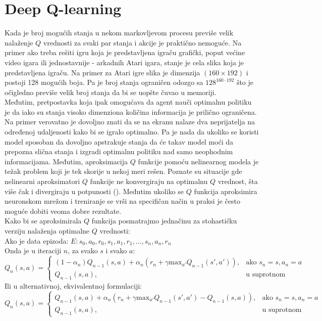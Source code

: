 \documentclass[a4paper,fleqn,12pt]{JMThesis}
\newcommand{\latin}{\fontencoding{T1}\selectfont\selectlanguage{english}}
\theoremstyle{plain}
\theoremstyle{definition}
\theoremstyle{definition}
\begin{document}
\section{Deep Q-learning}
Kada je broj mogućih stanja u nekom markovljevom procesu previše velik nalaženje $Q$ vrednosti za svaki par stanja i akcije je praktično
nemoguće. Na primer ako treba rešiti igru koja je predstavljena igraču grafički, poput većine video igara ili jednostavnije -
arkadnih Atari igara, stanje je cela slika koja je predstavljena igraču. Na primer za Atari igre slika je dimenzija $(160 \times 192)$
i postoji 128 mogućih boja. Pa je broj stanja ograničen odozgo sa $128^{160\cdot 192}$ što je očigledno previše velik broj stanja da bi
se uopšte čuvao u memoriji.\\
Međutim, pretpostavka koja ipak omogućava da agent nauči optimalnu politiku je da iako su stanja visoko dimenziona količina informacija je
prilično ograničena. Na primer verovatno je dovoljno znati da se na ekranu nalaze dva neprijatelja na određenoj udaljenosti kako bi
se igralo optimalno. Pa je nada da ukoliko se koristi model sposoban da dovoljno apstrakuje stanja da će takav model moći da
prepozna slična stanja i izgradi optimalnu politiku nad samo neophodnim informacijama. Međutim, aproksimacija $Q$ funkcije pomoću
nelinearnog modela je težak problem koji je tek skorije u nekoj meri rešen. Poznate su situacije gde nelinearni aproksimatori
$Q$ funkcije ne konvergiraju na optimalnu $Q$ vrednost, šta više čak i divergiraju u potpunosti (\latin \cite{NEURIPS2018_5fd0245f}). 
Međutim ukoliko se $Q$ funkcija aproksimira neuronskom mrežom i treniranje se vrši na specifičan način u praksi je često moguće dobiti
veoma dobre rezultate.\\
Kako bi se aproksimirala $Q$ funkcija posmatrajmo jednačinu za stohastičku verziju nalaženja optimalne $Q$ vrednosti:\\
Ako je data epizoda: $E: s_0,a_0,r_0,s_1,a_1,r_1,...,s_n,a_n,r_n$\\
Onda je u iteraciji $n$, za svako $s$ i svako $a$:\\
\[ 
	Q_n(s,a) =
	\begin{cases}
		(1-\alpha_n)Q_{n-1}(s,a) + \alpha_n (r_n + \gamma \text{max}_{a'}Q_{n-1}(s',a')), & \text{ako } s_n = s, a_n = a\\
		Q_{n-1}(s,a), & \text{u suprotnom}
	\end{cases}
\]
Ili u alternativnoj, ekvivalentnoj formulaciji:
\[ 
	Q_n(s,a) =
	\begin{cases}
		Q_{n-1}(s,a) + \alpha_n (r_n + \gamma \text{max}_{a'}Q_{n-1}(s',a') - Q_{n-1}(s,a)), & \text{ako } s_n = s, a_n = a\\
		Q_{n-1}(s,a), & \text{u suprotnom}
	\end{cases}
\]
\end{document}
